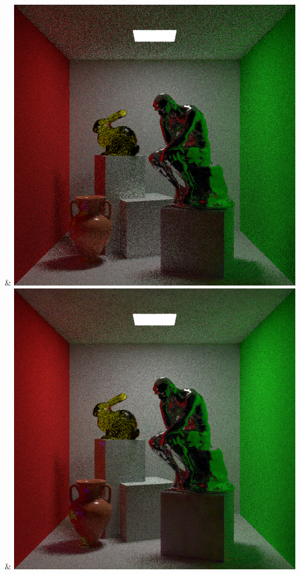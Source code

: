 & \includegraphics[width=\linewidth]{figures/py/tests/path_termination/sah+nee_1spp_thinker.png}
& \includegraphics[width=\linewidth]{figures/py/tests/path_termination/bth+nee_1spp_thinker.png}
